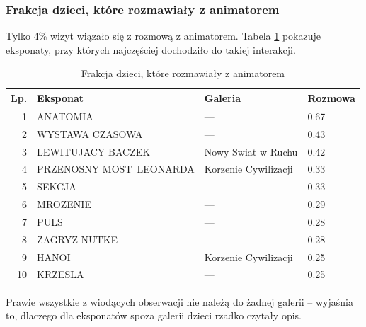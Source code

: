 \documentclass[conference]{IEEEtran}
\begin{document}
\subsubsection{Frakcja dzieci, które rozmawiały z animatorem}
Tylko 4\% wizyt wiązało się z rozmową z animatorem. Tabela \ref{top_animator} pokazuje eksponaty, przy których najczęściej dochodziło do takiej interakcji.
\begin{table}[H]
\caption{Frakcja dzieci, które rozmawiały z animatorem}
\label{top_animator}
\centering
\begin{tabular}{|r|p{3cm}|l|l|}
\hline
\textbf{Lp.} & \textbf{Eksponat} & \textbf{Galeria} & \textbf{Rozmowa} \\
\hline
1  &                ANATOMIA &               --- & 0.67 \\
2  &         WYSTAWA CZASOWA &               --- & 0.43 \\
3  &       LEWITUJACY BACZEK &   Nowy Swiat w Ruchu & 0.42 \\
4  & PRZENOSNY MOST~LEONARDA & Korzenie Cywilizacji & 0.33 \\
5  &                  SEKCJA &               --- & 0.33 \\
6  &                MROZENIE &               --- & 0.29 \\
7  &                    PULS &               --- & 0.28 \\
8  &            ZAGRYZ NUTKE &               --- & 0.28 \\
9  &                   HANOI & Korzenie Cywilizacji & 0.25 \\
10 &                 KRZESLA &               --- & 0.25 \\
\hline
\end{tabular}
\end{table}
Prawie wszystkie z wiodących obserwacji nie należą do żadnej galerii -- wyjaśnia to, dlaczego dla eksponatów spoza galerii dzieci rzadko czytały opis.
\end{document}
